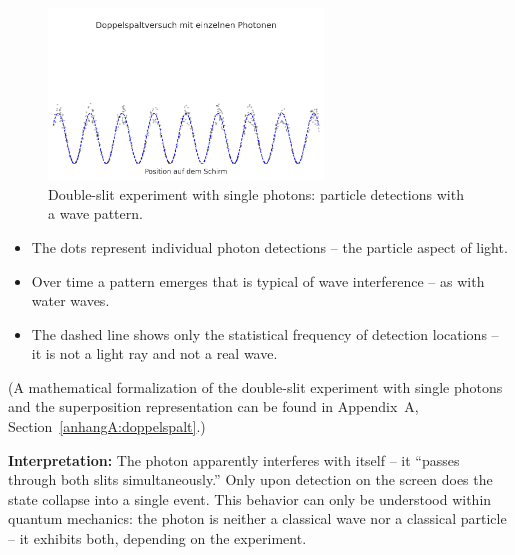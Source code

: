 \vspace{1em}
\begin{figure}[H]
	\begin{center}
		\includegraphics[width=0.65\textwidth]{bilder/doppelspalt-photonen.png}
	\end{center}
	\caption{Double-slit experiment with single photons: particle detections with a wave pattern.}
\end{figure}
\newpage
\noindent
\begin{tcolorbox}[physikbox, title=What the Photon Graphic is Meant to Show]
	\label{box:was die photonengrafik}
	\small
	\begin{itemize}
		\item The dots represent individual photon detections – the particle aspect of light.
		\item Over time a pattern emerges that is typical of wave interference – as with water waves.
		\item The dashed line shows only the statistical frequency of detection locations – it is not a light ray and not a real wave.
	\end{itemize}
\end{tcolorbox}
\vspace{1em}
(A mathematical formalization of the double-slit experiment with single photons and the superposition representation can be found in Appendix~A, Section~\ref{anhangA:doppelspalt}.) 

\textbf{Interpretation:}  
The photon apparently interferes with itself – it “passes through both slits simultaneously.” Only upon detection on the screen does the state collapse into a single event. This behavior can only be understood within quantum mechanics: the photon is neither a classical wave nor a classical particle – it exhibits both, depending on the experiment.

